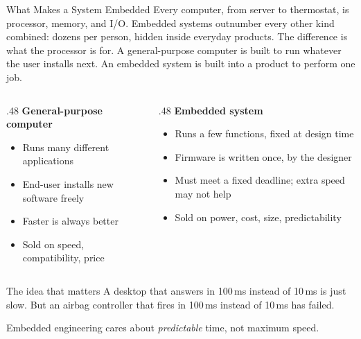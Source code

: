 \documentclass[9pt,aspectratio=169,xcolor=table]{beamer}
\begin{document}
\begin{frame}{What Makes a System Embedded}
    \leavevmode
    {\small Every computer, from server to thermostat, is processor,
    memory, and I/O. Embedded systems outnumber every other kind
    \alert{combined}: dozens per person, hidden inside everyday
    products. The difference is \alert{what the
    processor is for}. A general-purpose computer is built to run
    whatever the user installs next. An embedded system is built into
    a product to perform one job.}

    \vspace{2mm}
    \begin{columns}[T]
    \begin{column}{.48\textwidth}
        \textbf{General-purpose computer}
        \begin{itemize}
            \item Runs many different applications
            \item End-user installs new software freely
            \item \alert{Faster is always better}
            \item Sold on speed, compatibility, price
        \end{itemize}
    \end{column}
    \begin{column}{.48\textwidth}
        \textbf{Embedded system}
        \begin{itemize}
            \item Runs a few functions, fixed at design time
            \item Firmware is written once, by the designer
            \item Must meet a \alert{fixed deadline}; extra speed may not help
            \item Sold on power, cost, size, \alert{predictability}
        \end{itemize}
    \end{column}
    \end{columns}

    \vspace{3mm}
    \begin{block}{The idea that matters}
        A desktop that answers in 100\,ms instead of 10\,ms is just
        slow. But an airbag controller that fires in 100\,ms instead
        of 10\,ms has \alert{failed}.

        \vspace{1mm}
        Embedded engineering cares about \emph{predictable} time, not
        maximum speed.
    \end{block}
\end{frame}
\end{document}

